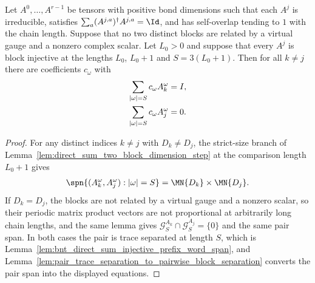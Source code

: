 \begin{lemma}
    \label{thm:ph_three_block_pairwise_separation}
    \leanok
    Let $A^0,\ldots,A^{r-1}$ be tensors with positive bond dimensions such
    that each $A^j$ is irreducible, satisfies
    $\sum_a(A^{j,a})^\dagger A^{j,a}=\Id$, and has self-overlap tending to
    $1$ with the chain length. Suppose that no two distinct blocks are
    related by a virtual gauge and a nonzero complex scalar. Let $L_0>0$ and
    suppose that every $A^j$ is block injective at the lengths $L_0$,
    $L_0+1$ and $S=3(L_0+1)$. Then for all $k\ne j$ there are coefficients
    $c_\omega$ with
    \begin{align}
        \sum_{|\omega|=S}c_\omega A_k^\omega & =I,
        \notag                                     \\
        \sum_{|\omega|=S}c_\omega A_j^\omega & =0.
        \notag
    \end{align}
\end{lemma}
\begin{proof}
    \leanok
    For any distinct indices $k\ne j$ with $D_k\ne D_j$, the strict-size branch
    of Lemma~\ref{lem:direct_sum_two_block_dimension_step} at the comparison
    length $L_0+1$ gives
    \begin{align}
        \spn\{(A_k^\omega,A_j^\omega):|\omega|=S\}=\MN{D_k}\times\MN{D_j}.
        \notag
    \end{align}
    If $D_k=D_j$, the blocks are not related by a virtual gauge and a nonzero
    scalar, so their periodic matrix product vectors are not proportional at
    arbitrarily long chain lengths, and the same lemma gives
    $\mathcal G_S^{A_k}\cap\mathcal G_S^{A_j}=\{0\}$ and the same pair span.
    In both cases the pair is trace separated at length $S$, which is
    Lemma~\ref{lem:bnt_direct_sum_injective_prefix_word_span}, and
    Lemma~\ref{lem:pair_trace_separation_to_pairwise_block_separation}
    converts the pair span into the displayed equations.
\end{proof}

